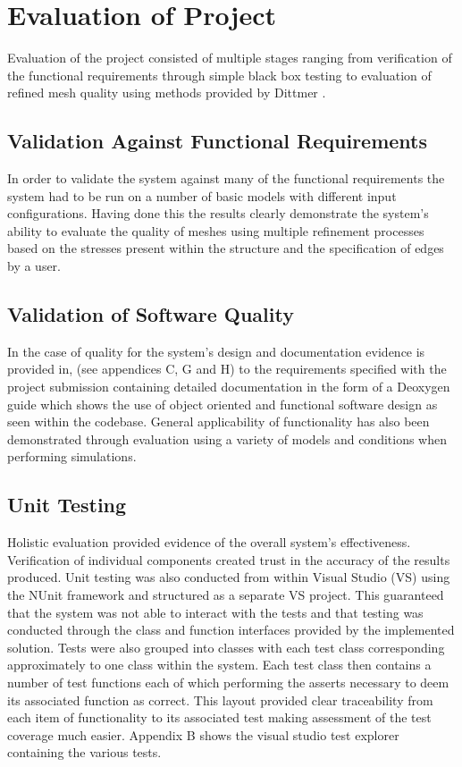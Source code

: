 
\section{Evaluation of Project}
Evaluation of the project consisted of multiple stages ranging from verification of the functional requirements through simple black box testing to evaluation of refined mesh quality using methods provided by Dittmer \cite{DittmerMeshQualityMet}. 

\subsection{Validation Against Functional Requirements}
In order to validate the system against many of the functional requirements the system had to be run on a number of basic models with different input configurations. Having done this the results clearly demonstrate the system's ability to evaluate the quality of meshes using multiple refinement processes based on the stresses present within the structure and the specification of edges by a user. \\ 

\subsection{Validation of Software Quality}
\noindent
In the case of quality for the system's design and documentation evidence is provided in, (see appendices C, G and H)  to the requirements specified with the project submission containing detailed documentation in the form of a Deoxygen guide which shows the use of object oriented and functional software design as seen within the codebase. General applicability of functionality has also been demonstrated through evaluation using a variety of models and conditions when performing simulations.

\subsection{Unit Testing}
Holistic evaluation provided evidence of the overall system's effectiveness. Verification of individual components created trust in the accuracy of the results produced. Unit testing was also conducted from within Visual Studio (VS) using the NUnit framework and structured as a separate VS project. This guaranteed that the system was not able to interact with the tests and that testing was conducted through the class and function interfaces provided by the implemented solution. Tests were also grouped into classes with each test class corresponding approximately to one class within the system. Each test class then contains a number of test functions each of which performing the asserts necessary to deem its associated function as correct. This layout provided clear traceability from each item of functionality to its associated test making assessment of the test coverage much easier. Appendix B shows the visual studio test explorer containing the various tests. \\


